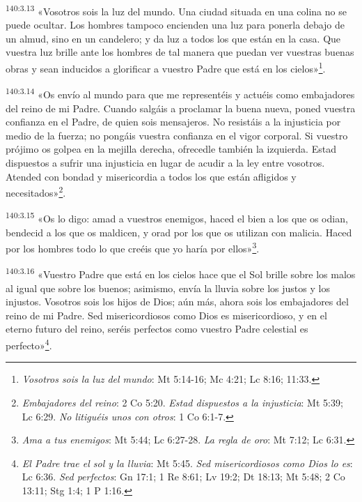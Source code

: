 \par
\textsuperscript{140:3.13} «Vosotros sois la luz del mundo. Una ciudad situada en una colina no se puede ocultar. Los hombres tampoco encienden una luz para ponerla debajo de un almud, sino en un candelero; y da luz a todos los que están en la casa. Que vuestra luz brille ante los hombres de tal manera que puedan ver vuestras buenas obras y sean inducidos a glorificar a vuestro Padre que está en los cielos»\footnote{\textit{Vosotros sois la luz del mundo}: Mt 5:14-16; Mc 4:21; Lc 8:16; 11:33.}.

\par
\textsuperscript{140:3.14} «Os envío al mundo para que me representéis y actuéis como embajadores del reino de mi Padre. Cuando salgáis a proclamar la buena nueva, poned vuestra confianza en el Padre, de quien sois mensajeros. No resistáis a la injusticia por medio de la fuerza; no pongáis vuestra confianza en el vigor corporal. Si vuestro prójimo os golpea en la mejilla derecha, ofrecedle también la izquierda. Estad dispuestos a sufrir una injusticia en lugar de acudir a la ley entre vosotros. Atended con bondad y misericordia a todos los que están afligidos y necesitados»\footnote{\textit{Embajadores del reino}: 2 Co 5:20. \textit{Estad dispuestos a la injusticia}: Mt 5:39; Lc 6:29. \textit{No litiguéis unos con otros}: 1 Co 6:1-7.}.

\par
\textsuperscript{140:3.15} «Os lo digo: amad a vuestros enemigos, haced el bien a los que os odian, bendecid a los que os maldicen, y orad por los que os utilizan con malicia. Haced por los hombres todo lo que creéis que yo haría por ellos»\footnote{\textit{Ama a tus enemigos}: Mt 5:44; Lc 6:27-28. \textit{La regla de oro}: Mt 7:12; Lc 6:31.}.

\par
\textsuperscript{140:3.16} «Vuestro Padre que está en los cielos hace que el Sol brille sobre los malos al igual que sobre los buenos; asimismo, envía la lluvia sobre los justos y los injustos. Vosotros sois los hijos de Dios; aún más, ahora sois los embajadores del reino de mi Padre. Sed misericordiosos como Dios es misericordioso, y en el eterno futuro del reino, seréis perfectos como vuestro Padre celestial es perfecto»\footnote{\textit{El Padre trae el sol y la lluvia}: Mt 5:45. \textit{Sed misericordiosos como Dios lo es}: Lc 6:36. \textit{Sed perfectos}: Gn 17:1; 1 Re 8:61; Lv 19:2; Dt 18:13; Mt 5:48; 2 Co 13:11; Stg 1:4; 1 P 1:16.}.

